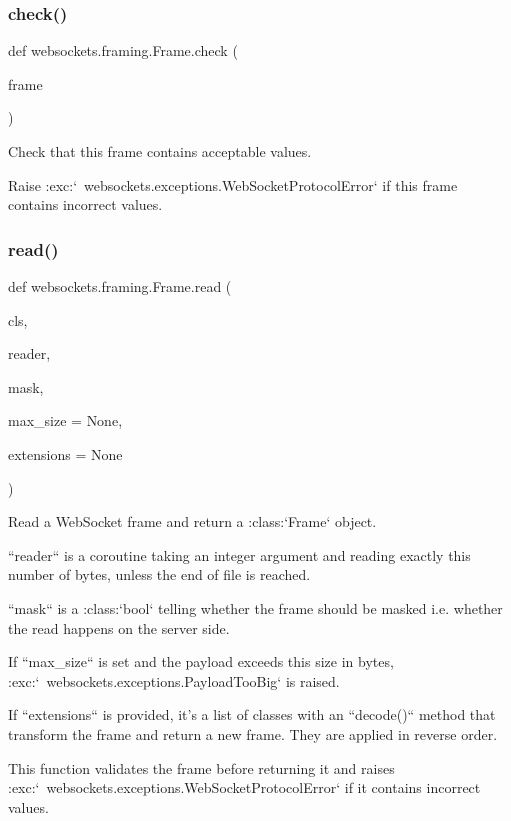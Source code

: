 \subsubsection{\texorpdfstring{check()}{check()}}
{\footnotesize\ttfamily def websockets.\+framing.\+Frame.\+check (\begin{DoxyParamCaption}\item[{}]{frame }\end{DoxyParamCaption})}

\begin{DoxyVerb}Check that this frame contains acceptable values.

Raise :exc:`~websockets.exceptions.WebSocketProtocolError` if this
frame contains incorrect values.\end{DoxyVerb}
 \mbox{\label{classwebsockets_1_1framing_1_1_frame_ac6097dbf7626110e68e0c8b8e0211469}} 
\subsubsection{\texorpdfstring{read()}{read()}}
{\footnotesize\ttfamily def websockets.\+framing.\+Frame.\+read (\begin{DoxyParamCaption}\item[{}]{cls,  }\item[{}]{reader,  }\item[{}]{mask,  }\item[{}]{max\+\_\+size = {\ttfamily None},  }\item[{}]{extensions = {\ttfamily None} }\end{DoxyParamCaption})}

\begin{DoxyVerb}Read a WebSocket frame and return a :class:`Frame` object.

``reader`` is a coroutine taking an integer argument and reading
exactly this number of bytes, unless the end of file is reached.

``mask`` is a :class:`bool` telling whether the frame should be masked
i.e. whether the read happens on the server side.

If ``max_size`` is set and the payload exceeds this size in bytes,
:exc:`~websockets.exceptions.PayloadTooBig` is raised.

If ``extensions`` is provided, it's a list of classes with an
``decode()`` method that transform the frame and return a new frame.
They are applied in reverse order.

This function validates the frame before returning it and raises
:exc:`~websockets.exceptions.WebSocketProtocolError` if it contains
incorrect values.\end{DoxyVerb}
 \mbox{\label{classwebsockets_1_1framing_1_1_frame_a318a898942fe4545692eaf96da9983e9}} 
